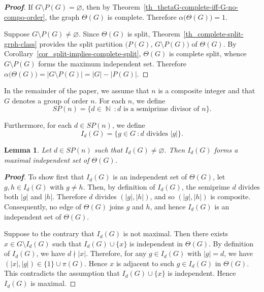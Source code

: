 \documentclass{amsart}
\theoremstyle{plain}
\newtheorem{lemma}[theorem]{Lemma}
\theoremstyle{definition}
\DeclareMathOperator{\N}{\mathbb{N}}
\begin{document}
\begin{proof}[\textbf{Proof}]
If $G\setminus P(G) = \varnothing$, then by Theorem~\ref{th_thetaG-complete-iff-G-no-compo-order}, the graph $\Theta(G)$ is complete. Therefore $\alpha\bigl(\Theta(G)\bigr) = 1$. 

\vspace{0.4mm}
Suppose $G\setminus P(G)\neq \varnothing$. Since $\Theta(G)$ is split, Theorem~\ref{th_complete-split-grph-class} provides the split partition $\bigl(P(G),\, G\setminus P(G)\bigr)$ of $\Theta(G)$. By Corollary~\ref{cor_split-implies-complete-split}, $\Theta(G)$ is complete split, whence $G \setminus P(G)$ forms the maximum independent set. Therefore $\alpha\bigl(\Theta(G)\bigr) = |G\setminus P(G)| = |G|- |P(G)|$.
\end{proof}



In the remainder of the paper, we assume that $n$ is a composite integer and that $G$ denotes a group of order $n$. For each $n$, we define 
\[SP(n) = \bigl\{d\in \N \ \colon d \text{ is a semiprime divisor of } n\bigr\}.\]

Furthermore, for each $d\in SP(n)$, we define \[I_d(G)=\bigl\{g\in G\ \colon d \text{ divides } |g|\bigr\}.\]


\begin{lemma}\label{le_Id-maximal-set}
Let $d\in SP(n)$ such that $I_d(G) \neq \varnothing$. Then $I_d(G)$ forms a maximal independent set of $\Theta(G)$.
\end{lemma}

\begin{proof}[\textbf{Proof}]
To show first that $I_d(G)$ is an independent set of $\Theta(G)$, let $g,h\in I_d(G)$ with $g\neq h$. Then, by definition of $I_d(G)$, the semiprime $d$ divides both $|g|$ and $|h|$. Therefore $d$ divides $(|g|, |h|)$, and so $(|g|, |h|)$ is composite. Consequently, no edge of $\Theta(G)$ joins $g$ and $h$, and hence $I_d(G)$ is an independent set of $\Theta(G)$.


\vspace{0.5mm}
Suppose to the contrary that $I_{d}(G)$ is not maximal. Then there exists $x\in G\setminus I_{d}(G)$ such that $I_{d}(G)\cup \{x\}$ is independent in $\Theta(G)$. By definition of $I_{d}(G)$, we have $d\nmid |x|$. Therefore, for any $g\in I_{d}(G)$ with $|g| = d$, we have $(|x|, |g|)\in \{1\}\cup \pi(G)$. Hence $x$ is adjacent to such $g\in I_{d}(G)$ in $\Theta(G)$.
This contradicts the assumption that $I_{d}(G)\cup \{x\}$ is independent. Hence $I_{d}(G)$ is maximal.
\end{proof}
\end{document}
